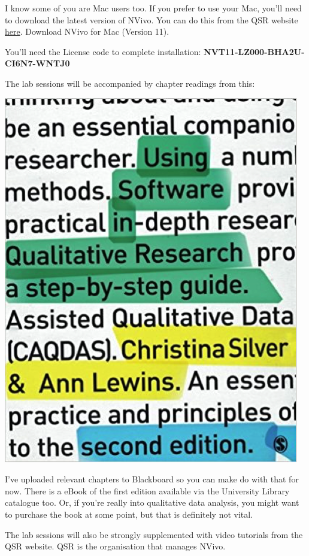 \documentclass[]{book}
\theoremstyle{definition}
\theoremstyle{definition}
\theoremstyle{definition}
\theoremstyle{remark}
\begin{document}
I know some of you are Mac users too. If you prefer to use your Mac,
you'll need to download the latest version of NVivo. You can do this
from the QSR website
\href{http://www.qsrinternational.com/nvivo/support-overview/downloads}{here}.
Download NVivo for Mac (Version 11).

You'll need the License code to complete installation:
\textbf{NVT11-LZ000-BHA2U-CI6N7-WNTJ0}

The lab sessions will be accompanied by chapter readings from this:

\includegraphics{imgs/qual_01.png}

I've uploaded relevant chapters to Blackboard so you can make do with
that for now. There is a eBook of the first edition available via the
University Library catalogue too. Or, if you're really into qualitative
data analysis, you might want to purchase the book at some point, but
that is definitely not vital.

The lab sessions will also be strongly supplemented with video tutorials
from the QSR website. QSR is the organisation that manages NVivo.
\end{document}
